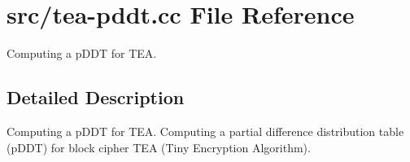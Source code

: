 \hypertarget{tea-pddt_8cc}{\section{src/tea-\/pddt.cc \-File \-Reference}
\label{tea-pddt_8cc}
}


\-Computing a p\-D\-D\-T for \-T\-E\-A.  




\subsection{\-Detailed \-Description}
\-Computing a p\-D\-D\-T for \-T\-E\-A. \-Computing a partial difference distribution table (p\-D\-D\-T) for block cipher \-T\-E\-A (\-Tiny \-Encryption \-Algorithm). 